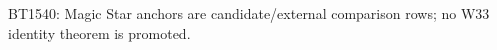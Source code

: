 \begin{center}\small
BT1540: Magic Star anchors are candidate/external comparison rows; no W33 identity theorem is promoted.
\end{center}
